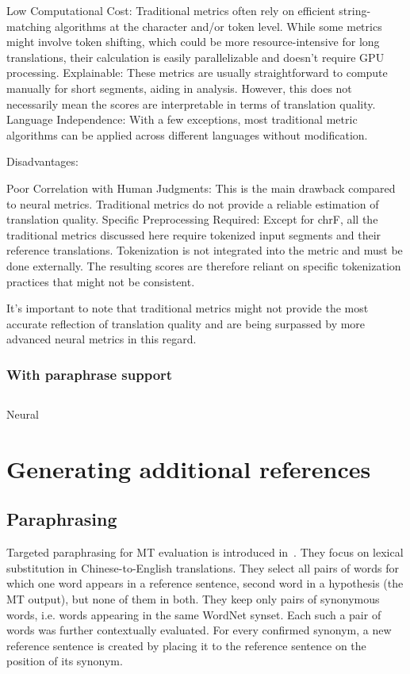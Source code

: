     Low Computational Cost: Traditional metrics often rely on efficient string-matching algorithms at the character and/or token level. While some metrics might involve token shifting, which could be more resource-intensive for long translations, their calculation is easily parallelizable and doesn't require GPU processing.
    Explainable: These metrics are usually straightforward to compute manually for short segments, aiding in analysis. However, this does not necessarily mean the scores are interpretable in terms of translation quality.
    Language Independence: With a few exceptions, most traditional metric algorithms can be applied across different languages without modification.

Disadvantages:

    Poor Correlation with Human Judgments: This is the main drawback compared to neural metrics. Traditional metrics do not provide a reliable estimation of translation quality.
    Specific Preprocessing Required: Except for chrF, all the traditional metrics discussed here require tokenized input segments and their reference translations. Tokenization is not integrated into the metric and must be done externally. The resulting scores are therefore reliant on specific tokenization practices that might not be consistent.

It's important to note that traditional metrics might not provide the most accurate reflection of translation quality and are being surpassed by more advanced neural metrics in this regard.


\subsubsection{With paraphrase support}


\subsection{}{Neural}




\section{Generating additional references}
\subsection{Paraphrasing}
Targeted paraphrasing for MT evaluation is introduced in~\citet{kauchak}. They 
focus on lexical substitution in Chinese-to-English translations. 
They select all pairs of words for which one word appears in a reference sentence,
second word in a hypothesis (the MT output), but none of them in both. They keep 
only pairs of synonymous words, i.e. words appearing in the same WordNet 
\cite{wordnet} synset. Each such a pair of words was further contextually evaluated. 
For every confirmed synonym, a new reference sentence is created by placing it to the
reference sentence on the position of its synonym.


